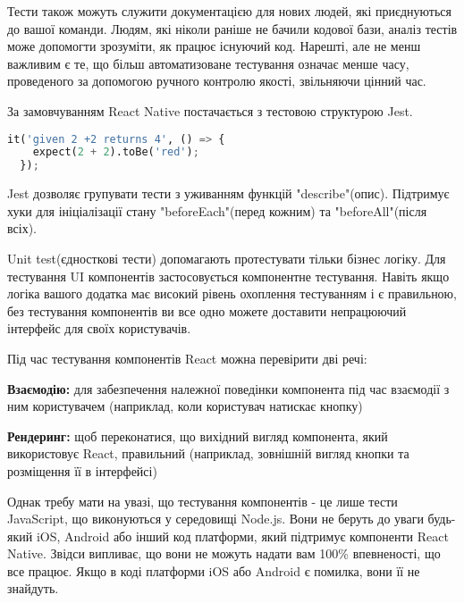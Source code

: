 Тести також можуть служити документацією для нових людей, які приєднуються до вашої команди.
Людям, які ніколи раніше не бачили кодової бази, аналіз тестів може допомогти зрозуміти, як працює існуючий код.
Нарешті, але не менш важливим є те, що більш автоматизоване тестування означає менше часу, проведеного за допомогою
ручного контролю якості, звільняючи цінний час.

За замовчуванням React Native постачається з тестовою структурою Jest. \cite{jest_home_page}

\begin{lstlisting}[style=light, language=Python,label={lst:rn_jest_test},caption=Jest Unit Test]
  it('given 2 +2 returns 4', () => {
    expect(2 + 2).toBe('red');
  });
\end{lstlisting}

Jest дозволяє групувати тести з уживанням функцій "describe"(опис).
Підтримує хуки для ініціалізації стану "beforeEach"(перед кожним) та "beforeAll"(після всіх).

Unit test(єдносткові тести) допомагають протестувати тільки бізнес логіку.
Для тестування UI компонентів застосовується компонентне тестування.
Навіть якщо логіка вашого додатка має високий рівень охоплення тестуванням і є правильною,
без тестування компонентів ви все одно можете доставити непрацюючий інтерфейс для своїх користувачів.

Під час тестування компонентів React можна перевірити дві речі:

\begin{itemize}
    \begin{item}
        \textbf{Взаємодію:} для забезпечення належної поведінки компонента під час взаємодії з ним користувачем (наприклад, коли користувач натискає кнопку)
    \end{item}
    \begin{item}
        \textbf{Рендеринг:} щоб переконатися, що вихідний вигляд компонента, який використовує React, правильний (наприклад, зовнішній вигляд кнопки та розміщення її в інтерфейсі)
    \end{item}
\end{itemize}

Однак требу мати на увазі, що тестування компонентів - це лише тести JavaScript, що виконуються у середовищі Node.js.
Вони не беруть до уваги будь-який iOS, Android або інший код платформи, який підтримує компоненти React Native.
Звідси випливає, що вони не можуть надати вам 100\% впевненості, що все працює.
Якщо в коді платформи iOS або Android є помилка, вони її не знайдуть.

